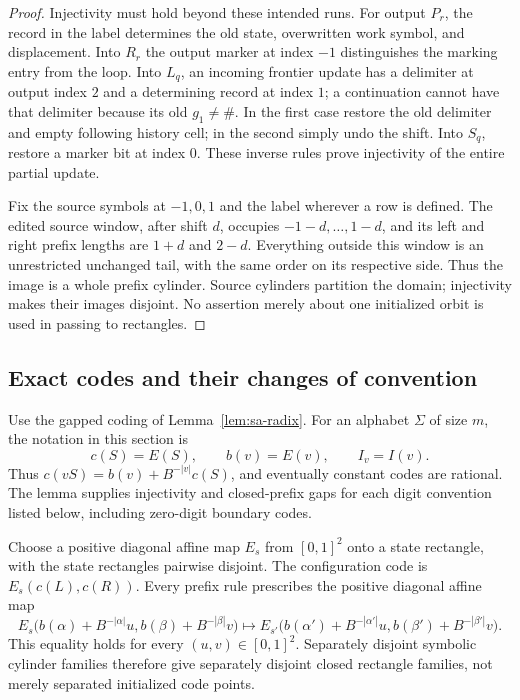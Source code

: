 \begin{proof}
Injectivity must hold beyond these intended runs.  For output $P_r$, the record in the label determines the old state, overwritten work symbol, and displacement.  Into $R_r$ the output marker at index $-1$ distinguishes the marking entry from the loop.  Into $L_q$, an incoming frontier update has a delimiter at output index $2$ and a determining record at index $1$; a continuation cannot have that delimiter because its old $g_1\ne\#$.  In the first case restore the old delimiter and empty following history cell; in the second simply undo the shift.  Into $S_q$, restore a marker bit at index $0$.  These inverse rules prove injectivity of the entire partial update.

Fix the source symbols at $-1,0,1$ and the label wherever a row is defined.  The edited source window, after shift $d$, occupies $-1-d,\ldots,1-d$, and its left and right prefix lengths are $1+d$ and $2-d$.  Everything outside this window is an unrestricted unchanged tail, with the same order on its respective side.  Thus the image is a whole prefix cylinder.  Source cylinders partition the domain; injectivity makes their images disjoint.  No assertion merely about one initialized orbit is used in passing to rectangles.
\end{proof}

\subsection{Exact codes and their changes of convention}
\label{subsec:sb-codes}
Use the gapped coding of Lemma~\ref{lem:sa-radix}. For an alphabet
$\Sigma$ of size $m$, the notation in this section is
\[
 c(S)=E(S),\qquad b(v)=E(v),\qquad I_v=I(v).
\]
Thus $c(vS)=b(v)+B^{-|v|}c(S)$, and eventually constant codes are
rational. The lemma supplies injectivity and closed-prefix gaps for
each digit convention listed below, including zero-digit boundary codes.

Choose a positive diagonal affine map $E_s$ from $[0,1]^2$ onto a state rectangle, with the state rectangles pairwise disjoint.  The configuration code is $E_s(c(L),c(R))$.  Every prefix rule prescribes the positive diagonal affine map
\begin{equation}\label{eq:sb-coded-map}
 E_s\big(b(\alpha)+B^{-|\alpha|}u,
          b(\beta)+B^{-|\beta|}v\big)
 \longmapsto
 E_{s'}\big(b(\alpha')+B^{-|\alpha'|}u,
          b(\beta')+B^{-|\beta'|}v\big).
\end{equation}
This equality holds for every $(u,v)\in[0,1]^2$.  Separately disjoint symbolic cylinder families therefore give separately disjoint closed rectangle families, not merely separated initialized code points.

